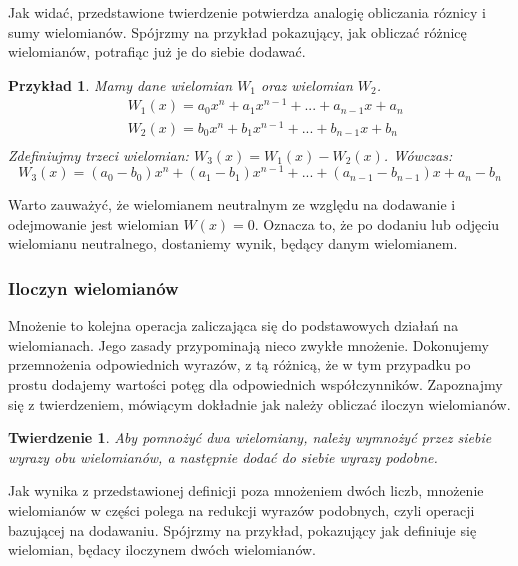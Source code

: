 \documentclass[twoside,a4paper]{book}
\newtheorem{theorem}{Twierdzenie}
\newtheorem{example}{Przykład}
\begin{document}
Jak widać, przedstawione twierdzenie potwierdza analogię obliczania róznicy i sumy wielomianów. Spójrzmy na przykład pokazujący, jak obliczać różnicę wielomianów, potrafiąc już je do siebie dodawać.

\begin{example}
	Mamy dane wielomian $W_1$ oraz wielomian $W_2$.
	\begin{equation}
	\begin{split}
	&W_1(x) = a_0x^n + a_1x^{n-1} + ... + a_{n-1}x + a_n \\
	&W_2(x) = b_0x^n + b_1x^{n-1} + ... + b_{n-1}x + b_n \\
	\end{split}
	\end{equation}
	Zdefiniujmy trzeci wielomian: $W_3(x) = W_1(x) - W_2(x)$. Wówczas:
	\begin{equation}
		W_3(x) = (a_0-b_0)x^n + (a_1-b_1)x^{n-1} + ... + (a_{n-1} - b_{n-1})x + a_n - b_n
	\end{equation}
\end{example}

Warto zauważyć, że wielomianem neutralnym ze względu na dodawanie i odejmowanie jest wielomian $W(x)=0$. Oznacza to, że po dodaniu lub odjęciu wielomianu neutralnego, dostaniemy wynik, będący danym wielomianem.

\subsubsection{Iloczyn wielomianów}

Mnożenie to kolejna operacja zaliczająca się do podstawowych działań na wielomianach. Jego zasady przypominają nieco zwykłe mnożenie. Dokonujemy przemnożenia odpowiednich wyrazów, z tą różnicą, że w tym przypadku po prostu dodajemy wartości potęg dla odpowiednich współczynników. Zapoznajmy się z twierdzeniem, mówiącym dokładnie jak należy obliczać iloczyn wielomianów.

\begin{theorem}
	Aby pomnożyć dwa wielomiany, należy wymnożyć przez siebie wyrazy obu wielomianów, a następnie dodać do siebie wyrazy podobne.
\end{theorem}

Jak wynika z przedstawionej definicji poza mnożeniem dwóch liczb, mnożenie wielomianów w części polega na redukcji wyrazów podobnych, czyli operacji bazującej na dodawaniu. Spójrzmy na przykład, pokazujący jak definiuje się wielomian, będacy iloczynem dwóch wielomianów.
\end{document}
